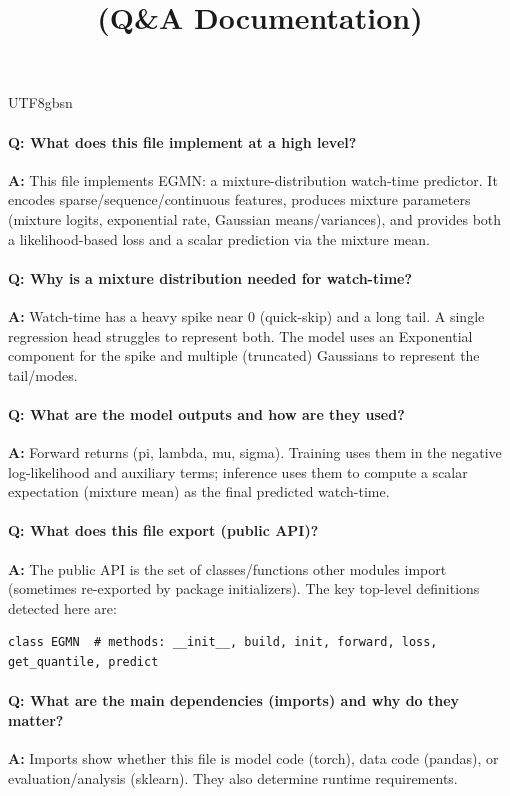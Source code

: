 \documentclass[11pt]{article}
\title{\texttt{\detokenize{model/egmn.py}} (Q\&A Documentation)}
\author{}
\date{}
\begin{document}
\begin{CJK*}{UTF8}{gbsn}
\maketitle

\paragraph{Q: What does this file implement at a high level?}
\textbf{A:} This file implements EGMN: a mixture-distribution watch-time predictor. It encodes sparse/sequence/continuous features, produces mixture parameters (mixture logits, exponential rate, Gaussian means/variances), and provides both a likelihood-based loss and a scalar prediction via the mixture mean.

\paragraph{Q: Why is a mixture distribution needed for watch-time?}
\textbf{A:} Watch-time has a heavy spike near 0 (quick-skip) and a long tail. A single regression head struggles to represent both. The model uses an Exponential component for the spike and multiple (truncated) Gaussians to represent the tail/modes.

\paragraph{Q: What are the model outputs and how are they used?}
\textbf{A:} Forward returns (pi, lambda, mu, sigma). Training uses them in the negative log-likelihood and auxiliary terms; inference uses them to compute a scalar expectation (mixture mean) as the final predicted watch-time.

\paragraph{Q: What does this file export (public API)?}
\textbf{A:} The public API is the set of classes/functions other modules import (sometimes re-exported by package initializers). The key top-level definitions detected here are:

\begin{Verbatim}[fontsize=\small]
class EGMN  # methods: __init__, build, init, forward, loss, get_quantile, predict
\end{Verbatim}

\paragraph{Q: What are the main dependencies (imports) and why do they matter?}
\textbf{A:} Imports show whether this file is model code (torch), data code (pandas), or evaluation/analysis (sklearn). They also determine runtime requirements.


\end{CJK*}
\end{document}
